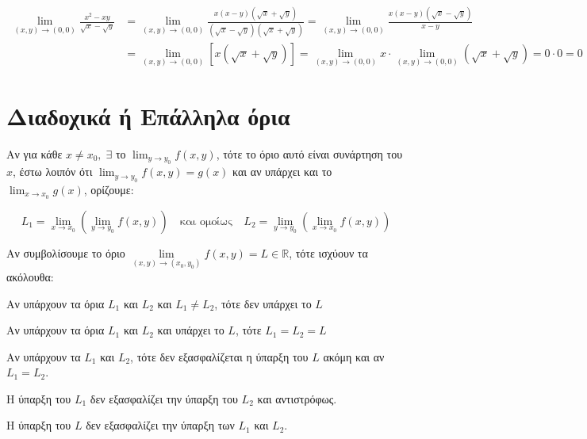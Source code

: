 \documentclass[a4paper,11pt]{report}
\begin{document}
  \begin{example}
    \begin{align*}
      \lim\limits_{(x,y)\to (0, 0)} \frac{x^{2}-xy}{\sqrt{x} - \sqrt{y}} 
    &= \lim\limits_{(x,y)\to (0, 0)} \frac{x(x-y)(\sqrt{x} + \sqrt{y})}{(\sqrt{x} -
    \sqrt{y} )(\sqrt{x} + \sqrt{y})} = \lim\limits_{(x,y)\to (0, 0)}
    \frac{x(x-y)(\sqrt{x} - \sqrt{y} )}{x-y} \\
    &= \lim\limits_{(x,y)\to (0,0)} [x(\sqrt{x} + \sqrt{y})] = \lim\limits_{(x,y)\to
    (0, 0)} x \cdot \lim\limits_{(x,y)\to (0, 0)} (\sqrt{x} + \sqrt{y}) = 0 \cdot 0 = 0 
    \end{align*}
  \end{example}


  

  \section{Διαδοχικά ή Επάλληλα όρια}

  \begin{mybox1}
    \begin{dfn}
      Αν για κάθε $ x \neq x_{0}, \; \exists $ το $ \lim_{y \to y_{0}} f(x,y) $, τότε το 
      όριο αυτό είναι συνάρτηση του $x$, έστω λοιπόν ότι 
      $ \lim_{y \to y_{0}} f(x,y) = g(x) $ και αν υπάρχει και το 
      $ \lim_{x \to x_{0}} g(x) $, ορίζουμε: 

      \[
        L_{1} = \lim_{x \to x_{0}} \left(\lim_{y \to y_{0}} f(x,y)\right) 
        \quad \text{και ομοίως} \quad
        L_{2} = \lim_{y \to y_{0}} \left(\lim_{x \to x_{0}} f(x,y)\right) 
      \] 
    \end{dfn}
  \end{mybox1}

  \begin{rem}
    Αν συμβολίσουμε το όριο 
    $ \lim\limits_{(x,y)\to (x_{0}, y_{0})} f(x,y) = L \in \mathbb{R} $, τότε 
    ισχύουν τα ακόλουθα:
    \begin{myitemize}
      \item Αν υπάρχουν τα όρια $ L_{1} $ και $ L_{2} $ και $ L_{1} \neq L_{2} $, τότε
        δεν υπάρχει το $ L $
      \item Αν υπάρχουν τα όρια $ L_{1} $ και $ L_{2} $ και υπάρχει το $ L $, τότε
        $ L_{1}=L_{2}=L $
      \item Αν υπάρχουν τα $ L_{1} $ και $ L_{2} $, τότε δεν εξασφαλίζεται η ύπαρξη του 
        $ L $ ακόμη και αν $ L_{1}=L_{2} $.
      \item Η ύπαρξη του $ L_{1} $ δεν εξασφαλίζει την ύπαρξη του $ L_{2} $ και 
        αντιστρόφως.
      \item Η ύπαρξη του $ L $ δεν εξασφαλίζει την ύπαρξη των $ L_{1} $ και $ L_{2} $.
    \end{myitemize}
  \end{rem}
\end{document}

